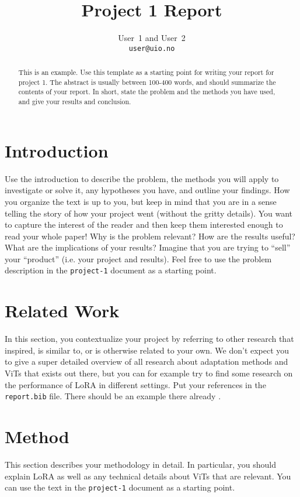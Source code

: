 \documentclass[10pt]{article}
\begin{document}
\title{Project 1 Report}
\author{User~1 and User~2\\\footnotesize\texttt{user@uio.no}}
\date{}
\maketitle

\begin{abstract}
  This is an example. Use this template as a starting point for writing your report for project 1. The abstract is usually between 100-400 words, and should summarize the contents of your report. In short, state the problem and the methods you have used, and give your results and conclusion.
\end{abstract}

\section{Introduction}
Use the introduction to describe the problem, the methods you will apply to investigate or solve it, any hypotheses you have, and outline your findings.
How you organize the text is up to you, but keep in mind that you are in a sense telling the story of how your project went (without the gritty details). You want to capture the interest of the reader and then keep them interested enough to read your whole paper!
Why is the problem relevant? How are the results useful? What are the implications of your results?
Imagine that you are trying to ``sell'' your ``product'' (i.e. your project and results).
Feel free to use the problem description in the \texttt{project-1} document as a starting point.

\section{Related Work}
In this section, you contextualize your project by referring to other research that inspired, is similar to, or is otherwise related to your own.
We don't expect you to give a super detailed overview of all research about adaptation methods and ViTs that exists out there, but you can for example try to find some research on the performance of LoRA in different settings.
Put your references in the \texttt{report.bib} file. There should be an example there already \cite{Test}.

\section{Method}
This section describes your methodology in detail. In particular, you should explain LoRA as well as any technical details about ViTs that are relevant.
You can use the text in the \texttt{project-1} document as a starting point.
\end{document}
